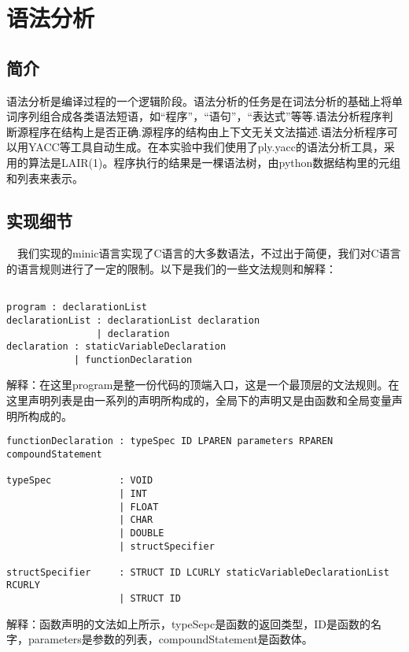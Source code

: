 \documentclass{article}
\begin{document}
\section{语法分析}

\subsection{简介}

语法分析是编译过程的一个逻辑阶段。语法分析的任务是在词法分析的基础上将单词序列组合成各类语法短语，如“程序”，“语句”，“表达式”等等.语法分析程序判断源程序在结构上是否正确.源程序的结构由上下文无关文法描述.语法分析程序可以用YACC等工具自动生成。在本实验中我们使用了ply.yacc的语法分析工具，采用的算法是LAIR(1)。程序执行的结果是一棵语法树，由python数据结构里的元组和列表来表示。

\subsection{实现细节}

\quad \ \ 我们实现的minic语言实现了C语言的大多数语法，不过出于简便，我们对C语言的语言规则进行了一定的限制。以下是我们的一些文法规则和解释：
\begin{verbatim}

program : declarationList
declarationList : declarationList declaration
                | declaration
declaration : staticVariableDeclaration
            | functionDeclaration

\end{verbatim}

解释：在这里program是整一份代码的顶端入口，这是一个最顶层的文法规则。在这里声明列表是由一系列的声明所构成的，全局下的声明又是由函数和全局变量声明所构成的。

\begin{verbatim}
functionDeclaration : typeSpec ID LPAREN parameters RPAREN compoundStatement

typeSpec            : VOID
                    | INT
                    | FLOAT
                    | CHAR
                    | DOUBLE
                    | structSpecifier
                              
structSpecifier     : STRUCT ID LCURLY staticVariableDeclarationList RCURLY
                    | STRUCT ID
\end{verbatim}

解释：函数声明的文法如上所示，typeSepc是函数的返回类型，ID是函数的名字，parameters是参数的列表，compoundStatement是函数体。
\end{document}

